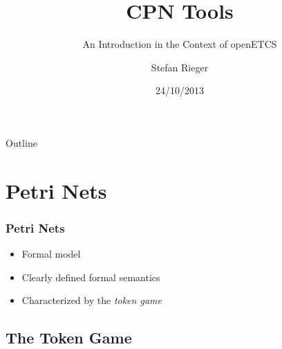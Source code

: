 \documentclass{beamer}
\title{CPN Tools}
\subtitle{An Introduction in the Context of openETCS}
\author{Stefan Rieger}
\institute{TWT GmbH Science \& Innovation\\~\\Stuttgart, Germany}
\date{24/10/2013}
\newenvironment{myitemize}{\begin{itemize}\addtolength{\itemsep}{2mm}}{\end{itemize}}
\begin{document}
\begin{frame}[plain]
  \titlepage
\end{frame}

\begin{frame}{Outline}
  \tableofcontents
\end{frame}

\section{Petri Nets}

\begin{frame}
\frametitle{Petri Nets}
\begin{myitemize}
  \item Formal model
  \item Clearly defined formal semantics
  \item Characterized by the \emph{token game}
\end{myitemize}
\end{frame}

\subsection{The Token Game}
\end{document}
